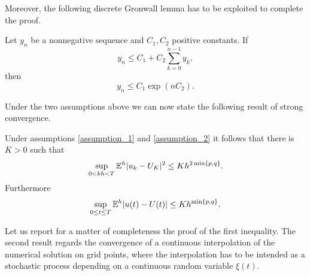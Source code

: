 \noindent Moreover, the following discrete Gronwall lemma has to be exploited to complete the proof. 
\begin{lemma}\label{thm:Gronwall} Let $y_n$ be a nonnegative sequence and $C_1, C_2$ positive constants. If
	\begin{equation}
	y_n \leq C_1 + C_2 \sum_{k=0}^{n-1} y_k,
	\end{equation}
	then 
	\begin{equation}
	y_n \leq C_1 \exp(nC_2).
	\end{equation}
\end{lemma}
\noindent Under the two assumptions above we can now state the following result of strong convergence.  
\begin{theorem}\label{thm:strongConv} Under assumptions \ref{assumption_1} and \ref{assumption_2} it follows that there is $K>0$ such that
\begin{equation}\label{strongConvDisc}
	\sup_{0<kh<T} \mathbb{E}^h|u_k - U_K|^2 \leq Kh^{2\min\{p,q\}}.
\end{equation}
Furthermore
\begin{equation}\label{strongConvCont}
	\sup_{0\leq t \leq T} \mathbb{E}^h|u(t) - U(t)| \leq Kh^{\min\{p, q\}}.
\end{equation}
\end{theorem}
\noindent Let us report for a matter of completeness the proof of the first inequality. The second result regards the convergence of a continuous interpolation of the numerical solution on grid points, where the interpolation has to be intended as a stochastic process depending on a continuous random variable $\xi(t)$. 
